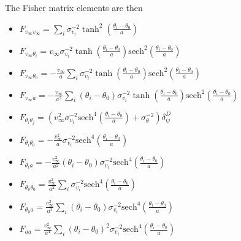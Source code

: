 \documentclass[11pt, oneside]{article}   	%
\begin{document}
The Fisher matrix elements are then
\begin{itemize}
\item $F_{v_\infty v_\infty} = \sum_i \sigma_{v_i}^{-2}  \tanh^2{\left(\frac{\theta_i - \theta_0}{a}\right)} $
\item $F_{v_\infty \theta_i}  =  v_\infty  \sigma_{v_i}^{-2} \tanh{\left(\frac{\theta_i - \theta_0}{a}\right)} \text{sech}^2{\left(\frac{\theta_i - \theta_0}{a}\right)}  $ 
\item $F_{v_\infty \theta_0}  =  -\frac{v_\infty }{a} \sum_i  \sigma_{v_i}^{-2}  \tanh{\left(\frac{\theta_i - \theta_0}{a}\right)} \text{sech}^2{\left(\frac{\theta_i - \theta_0}{a}\right)} $ 
\item $F_{v_\infty a}  =  -\frac{v_\infty }{a^2} \sum_i  (\theta_i - \theta_0) \sigma_{v_i}^{-2}  \tanh{\left(\frac{\theta_i - \theta_0}{a}\right)} \text{sech}^2{\left(\frac{\theta_i - \theta_0}{a}\right)} $ 
\item $F_{\theta_i \theta_j}  = ( v_\infty^2  \sigma_{v_i}^{-2}\text{sech}^4{\left(\frac{\theta_i - \theta_0}{a}\right)} + \sigma_\theta^{-2}) \delta^D_{ij}$ 
\item $F_{\theta_i \theta_0}  =  - \frac{v_\infty^2}{a}  \sigma_{v_i}^{-2}\text{sech}^4{\left(\frac{\theta_i - \theta_0}{a}\right)} $ 
\item $F_{\theta_i a}  =  - \frac{v_\infty^2}{a^2}   (\theta_i - \theta_0) \sigma_{v_i}^{-2}\text{sech}^4{\left(\frac{\theta_i - \theta_0}{a}\right)} $ 
\item $F_{\theta_0 \theta_0}  =   \frac{v_\infty^2}{a^2} \sum_i \sigma_{v_i}^{-2}\text{sech}^4{\left(\frac{\theta_i - \theta_0}{a}\right)} $ 
\item $F_{\theta_0 a}  =   \frac{v_\infty^2}{a^3} \sum_i  (\theta_i - \theta_0)  \sigma_{v_i}^{-2}\text{sech}^4{\left(\frac{\theta_i - \theta_0}{a}\right)} $ 
\item $F_{a a}  =   \frac{v_\infty^2}{a^4} \sum_i  (\theta_i - \theta_0)^2  \sigma_{v_i}^{-2}\text{sech}^4{\left(\frac{\theta_i - \theta_0}{a}\right)} $ 
\end{itemize}
\end{document}
